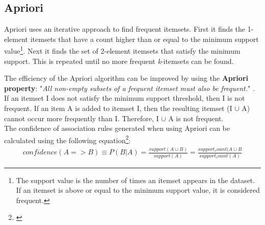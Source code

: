 \subsection{Apriori}
\label{Algo_AP}
Apriori uses an iterative approach to find frequent itemsets. First it finds the 1-element itemsets that have a count higher than or equal to the minimum support value\footnote{The support value is the number of times an itemset appears in the dataset. If an itemset is above or equal to the minimum support value, it is considered frequent.}. Next it finds the set of 2-element itemsets that satisfy the minimum support. This is repeated until no more frequent \textit{k}-itemsets can be found.

The efficiency of the Apriori algorithm can be improved by using the \textbf{Apriori property}: "\textit{All non-empty subsets of a frequent itemset must also be frequent.}" \cite[p. 249]{DataMining}. If an itemset I does not satisfy the minimum support threshold, then I is not frequent. If an item A is added to itemset I, then the resulting itemset (I $\cup$ A) cannot occur more frequently than I. Therefore, I $\cup$ A is not frequent.
\\The confidence of association rules generated when using Apriori can be calculated using the following equation\footnote{\cite[p. ~246]{DataMining}}:
\begin{align*}
confidence(A=>B) \equiv P(B|A) = \frac{support (A \cup B)}{support(A)} = \frac{support_count(A \cup B}{support_count(A)}
\end{align*}